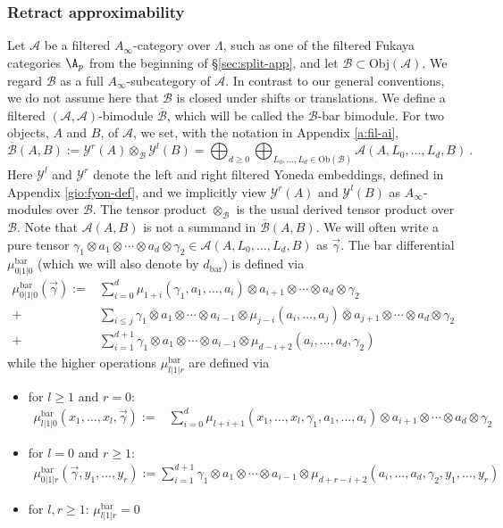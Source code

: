 \subsubsection{Retract approximability}\label{WRSG}
Let $\mathcal{A}$ be a filtered $A_{\infty}$-category over $\Lambda$, such as one of the filtered Fukaya categories $\A_{p}$ from the beginning of \S\ref{sec:split-app}, and
let $\mathcal{B}\subset \text{Obj}(\mathcal{A})$. We regard $\mathcal{B}$ as a full $A_\infty$-subcategory of $\mathcal{A}$. In contrast to our general conventions, we do not assume here that $\mathcal{B}$ is closed under shifts or translations. We define a filtered $(\mathcal{A},\mathcal{A})$-bimodule $\overline{\mathcal{B}}$, which will be called the $\mathcal{B}$-bar bimodule. For two objects, $A$ and $B$,  of $\mathcal{A}$, we set, with the notation in Appendix \ref{a:fil-ai},  $$\overline{\mathcal{B}}(A,B):=\mathcal{Y}^r(A)\otimes_\mathcal{B}\mathcal{Y}^l(B) = \bigoplus_{d\geq 0}\bigoplus_{L_0,\ldots, L_d\in  \text{Ob}(\mathcal{B})}\mathcal{A}(A,L_0,\ldots, L_d,B)~.~$$ 
Here $\mathcal{Y}^l$ and $\mathcal{Y}^r$ denote the left and right filtered Yoneda embeddings, defined in Appendix \ref{gio:fyon-def}, and we implicitly view $\mathcal{Y}^r(A)$ and $\mathcal{Y}^l(B)$ as $A_\infty$-modules over $\mathcal{B}$. The tensor product $\otimes_\mathcal{B}$ is the usual derived tensor product over $\mathcal{B}$. Note that $\mathcal{A}(A,B)$ is not a summand in $\overline{\mathcal{B}}(A,B)$. We will often write a pure tensor $\gamma_1\otimes a_1\otimes \cdots \otimes a_d\otimes \gamma_2 \in \mathcal{A}(A,L_0,\ldots, L_d,B)$ as $\vec{\gamma}$. The bar differential $\mu^{\text{bar}}_{0|1|0}$ (which we will also denote by $d_{\text{bar}}$) is defined via \begin{align*}\mu^{\text{bar}}_{0|1|0}(\vec{\gamma}):=& \sum_{i=0}^d\mu_{1+i}(\gamma_1,a_1,\ldots, a_i)\otimes a_{i+1}\otimes \cdots \otimes a_d\otimes \gamma_2\\ +& \sum_{i\leq j} \gamma_1\otimes a_1\otimes \cdots \otimes a_{i-1}\otimes \mu_{j-i}(a_i,\ldots, a_j)\otimes a_{j+1}\otimes \cdots\otimes a_d\otimes \gamma_2\\ +&\sum_{i=1}^{d+1} \gamma_1 \otimes a_1 \otimes \cdots \otimes a_{i-1}\otimes \mu_{d-i+2}(a_i,\dots, a_d,\gamma_2) \end{align*} while the higher operations $\mu^{\text{bar}}_{l|1|r}$ are defined via\begin{itemize}
	\item for $l\geq 1$ and $r=0$: \begin{align*}\mu^{\text{bar}}_{l|1|0}(x_1,\ldots, x_l, \vec{\gamma}) :=& \sum_{i=0}^{d}\mu_{l+i+1}(x_1,\ldots, x_l, \gamma_1,a_1,\ldots, a_i)\otimes a_{i+1}\otimes \cdots \otimes a_d\otimes \gamma_2 \end{align*}
	\item for $l=0$ and $r\geq 1$: \begin{align*} \mu^{\text{bar}}_{0|1|r}(\vec{\gamma},y_1,\ldots, y_r):= \sum_{i=1}^{d+1} \gamma_1\otimes a_1\otimes \cdots \otimes a_{i-1}\otimes \mu_{d+r-i+2}(a_i,\ldots, a_d,\gamma_2,y_1,\ldots, y_r) \end{align*}
	\item for $l,r\geq 1$: $\mu^{\text{bar}}_{l|1|r}=0$ \end{itemize}
